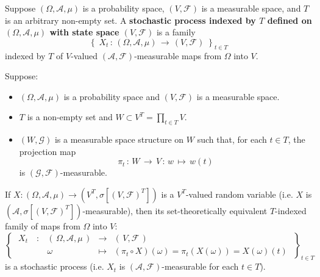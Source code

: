 \begin{definition}
\mbox{}\vskip 0.1cm
\noindent
Suppose $\left(\Omega,\mathcal{A},\mu\right)$ is a probability space,
$\left(V,\mathcal{F}\right)$ is a measurable space, and 
$T$ is an arbitrary non-empty set.
A
\textbf{stochastic process indexed by $T$ defined on $(\Omega,\mathcal{A},\mu)$
with state space $(V,\mathcal{F})$}
is a family
\begin{equation*}
\left\{\;
X_{t} \,:\, \left(\Omega,\mathcal{A},\mu\right)
\,\longrightarrow\,
\left(V,\mathcal{F}\right)
\;\right\}_{t \in T}
\end{equation*}
indexed by $T$ of $V$-valued $\left(\mathcal{A},\mathcal{F}\right)$-measurable
maps from $\Omega$ into $V$.
\end{definition}

\begin{corollary}
\mbox{}\vskip 0.1cm
\noindent
Suppose:
\begin{itemize}
\item	$\left(\Omega,\mathcal{A},\mu\right)$ is a probability space and
		$\left(V,\mathcal{F}\right)$ is a measurable space.
\item	$T$ is a non-empty set and $W \subset V^{T} = \prod_{t \in T}V$.
\item	$\left(W,\mathcal{G}\right)$ is a measurable space structure on $W$
		such that, for each $t \in T$, the projection map
		\begin{equation*}
			\pi_{t} \,:\, W \,\longrightarrow\, V \,:\, w \,\longmapsto\, w(t)
		\end{equation*}
		is $\left(\mathcal{G},\mathcal{F}\right)$-measurable.
\end{itemize}
If $X:\left(\Omega,\mathcal{A},\mu\right)\longrightarrow\left(V^{T},\sigma[(V,\mathcal{F})^{T}]\right)$
is a $V^{T}$-valued random variable
(i.e. $X$ is $\left(\mathcal{A},\sigma[(V,\mathcal{F})^{T}]\right)$-measurable),
then its set-theoretically equivalent $T$-indexed family of maps from $\Omega$ into $V$:
\begin{equation*}
	\left\{\;
	\begin{array}{cccl}
	X_{t}\quad :
	& \left(\,\Omega,\mathcal{A},\mu\,\right) & \longrightarrow & \left(\,V,\mathcal{F}\,\right) \\
	& \omega & \longmapsto & (\pi_{t} \circ X)(\omega) = \pi_{t}(X(\omega)) = X(\omega)(t)
	\end{array}
	\;\right\}_{t \in T}
\end{equation*}
is a stochastic process (i.e. $X_{t}$ is $(\mathcal{A},\mathcal{F})$-measurable for each $t\in T$).
\end{corollary}

